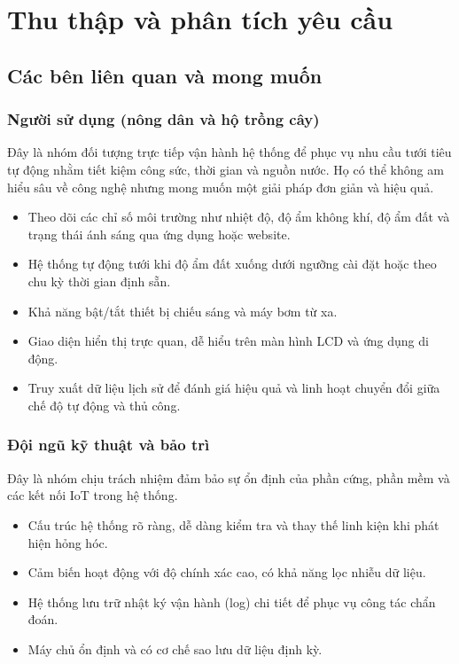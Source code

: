 \newpage
\section{Thu thập và phân tích yêu cầu}

\subsection{Các bên liên quan và mong muốn}

\subsubsection{Người sử dụng (nông dân và hộ trồng cây)}
Đây là nhóm đối tượng trực tiếp vận hành hệ thống để phục vụ nhu cầu tưới tiêu tự động nhằm tiết kiệm công sức, thời gian và nguồn nước. Họ có thể không am hiểu sâu về công nghệ nhưng mong muốn một giải pháp đơn giản và hiệu quả.
\begin{itemize}
    \item Theo dõi các chỉ số môi trường như nhiệt độ, độ ẩm không khí, độ ẩm đất và trạng thái ánh sáng qua ứng dụng hoặc website.
    \item Hệ thống tự động tưới khi độ ẩm đất xuống dưới ngưỡng cài đặt hoặc theo chu kỳ thời gian định sẵn.
    \item Khả năng bật/tắt thiết bị chiếu sáng và máy bơm từ xa.
    \item Giao diện hiển thị trực quan, dễ hiểu trên màn hình LCD và ứng dụng di động.
    \item Truy xuất dữ liệu lịch sử để đánh giá hiệu quả và linh hoạt chuyển đổi giữa chế độ tự động và thủ công.
\end{itemize}

\subsubsection{Đội ngũ kỹ thuật và bảo trì}
Đây là nhóm chịu trách nhiệm đảm bảo sự ổn định của phần cứng, phần mềm và các kết nối IoT trong hệ thống.
\begin{itemize}
    \item Cấu trúc hệ thống rõ ràng, dễ dàng kiểm tra và thay thế linh kiện khi phát hiện hỏng hóc.
    \item Cảm biến hoạt động với độ chính xác cao, có khả năng lọc nhiễu dữ liệu.
    \item Hệ thống lưu trữ nhật ký vận hành (log) chi tiết để phục vụ công tác chẩn đoán.
    \item Máy chủ ổn định và có cơ chế sao lưu dữ liệu định kỳ.
\end{itemize}

